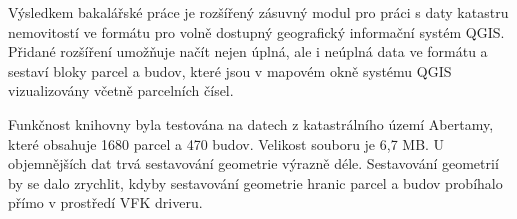 Výsledkem bakalářské práce je rozšířený zásuvný modul pro práci s daty
katastru nemovitostí ve formátu  pro volně dostupný
geografický informační systém QGIS. Přidané rozšíření umožňuje načít
nejen úplná, ale i neúplná data ve formátu  a sestaví bloky
parcel a budov, které jsou v mapovém okně systému QGIS vizualizovány
včetně parcelních čísel.

Funkčnost knihovny byla testována na datech z katastrálního území
Abertamy, které obsahuje 1680 parcel a 470 budov. Velikost 
souboru je 6,7 MB. U objemnějších dat trvá sestavování geometrie
výrazně déle. Sestavování geometrií by se dalo zrychlit, kdyby
sestavování geometrie hranic parcel a budov probíhalo přímo v
prostředí VFK driveru.



